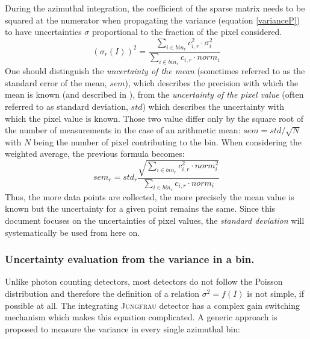 \documentclass[preprint]{iucr}              %
\begin{document}
During the azimuthal integration, the coefficient of the sparse matrix needs to be squared at the numerator when propagating the variance (equation \ref{varianceP}) to have uncertainties $\sigma$ proportional to the fraction of the pixel considered.
\begin{equation}
\label{varianceP}
(\sigma_{r}(I))^2 = \frac{\sum\limits_{i \in bin_r} c_{i,r}^2 \cdot \sigma_i^2}
                  {\sum\limits_{i \in bin_r} c_{i,r} \cdot norm_i} 
\end{equation}
One should distinguish the \textit{uncertainty of the mean} (sometimes referred to as the standard error of the mean, $sem$), 
which describes the precision with which the mean is known (and described in ),
from the \textit{uncertainty of the pixel value} (often referred to as standard deviation, $std$) which describes the uncertainty with which the pixel value is known. 
Those two value differ only by the square root of the number of measurements in the case of an arithmetic mean: $sem = std/\sqrt{N}$ with $N$ being the number of pixel contributing to the bin.
When considering the weighted average, the previous formula becomes:
\begin{equation}
\label{sem}
sem_r = std_r \frac{\sqrt{\sum\limits_{i \in bin_r} c_{i,r}^2 \cdot norm_i^2}}{\sum\limits_{i \in bin_r} c_{i,r} \cdot norm_i}
\end{equation}
Thus, the more data points are collected, the more precisely the mean value is known but the uncertainty for a given point remains the same.
Since this document focuses on the uncertainties of pixel values, the \textit{standard deviation} will systematically be used from here on.  

\subsubsection{Uncertainty evaluation from the variance in a bin.}

Unlike photon counting detectors, most detectors do not follow the Poisson distribution and therefore the definition of a relation $\sigma^2 = f(I)$ is not simple, if possible at all. 
The integrating \textsc{Jungfrau} detector has a complex gain switching mechanism \cite{jungfrau_PSI} which makes this equation complicated.
A generic approach is proposed to measure the variance in every single azimuthal bin:
\end{document}
